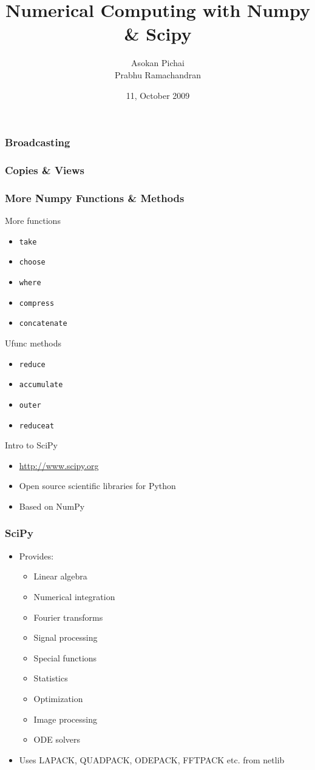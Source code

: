 \documentclass[14pt,compress]{beamer}
\title[]{Numerical Computing with Numpy \& Scipy}
\author[FOSSEE Team] {Asokan Pichai\\Prabhu Ramachandran}
\institute[FOSSEE] {FOSSEE Team}
\date[] {11, October 2009}
\newcounter{time}
\newcommand{\inctime}[1]{\addtocounter{time}{#1}{\tiny \thetime\ m}}
\newcommand{\typ}[1]{\lstinline{#1}}
\begin{document}
\begin{frame}[fragile]
  \frametitle{Broadcasting}

\end{frame}

\begin{frame}[fragile]
  \frametitle{Copies \& Views}

\end{frame}

\begin{frame}
  \frametitle{More Numpy Functions \& Methods}
  More functions
  \begin{itemize}
    \item \typ{take}
    \item \typ{choose}
    \item \typ{where}
    \item \typ{compress}
    \item \typ{concatenate}
  \end{itemize}
  Ufunc methods 
  \begin{itemize}
    \item \typ{reduce}
    \item \typ{accumulate}
    \item \typ{outer}
    \item \typ{reduceat}
  \end{itemize}
\end{frame}

\begin{frame}
    {Intro to SciPy}
  \begin{itemize}
  \item \url{http://www.scipy.org}
  \item Open source scientific libraries for Python
  \item Based on NumPy
    \end{itemize}

    \inctime{25}
\end{frame}

\begin{frame}
  \frametitle{SciPy}
  \begin{itemize}
  \item Provides:
    \begin{itemize}
    \item Linear algebra
    \item Numerical integration
    \item Fourier transforms
    \item Signal processing
    \item Special functions
    \item Statistics
    \item Optimization
    \item Image processing
    \item ODE solvers
    \end{itemize}
  \item Uses LAPACK, QUADPACK, ODEPACK, FFTPACK etc. from netlib
  \end{itemize}
\end{frame}
\end{document}
